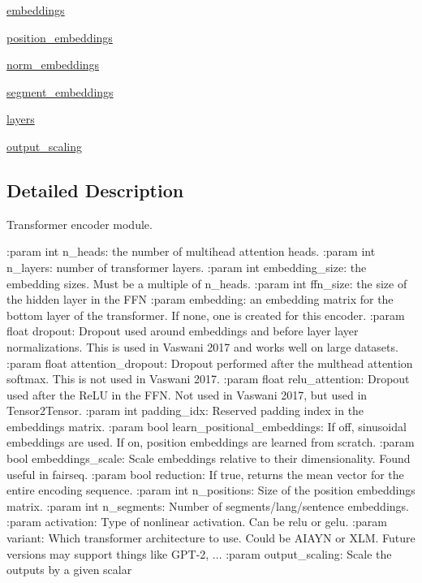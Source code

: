 \begin{DoxyCompactItemize}
\hyperlink{classparlai_1_1agents_1_1transformer_1_1modules_1_1TransformerEncoder_a179492c3f7ebaf6ba8fb3a7f912e93ce}{embeddings}
\item 
\hyperlink{classparlai_1_1agents_1_1transformer_1_1modules_1_1TransformerEncoder_ad2dd819e6d66d17f69e8bfa5026d192a}{position\+\_\+embeddings}
\item 
\hyperlink{classparlai_1_1agents_1_1transformer_1_1modules_1_1TransformerEncoder_ae8676d5d506949c00d35c34ac41b9fff}{norm\+\_\+embeddings}
\item 
\hyperlink{classparlai_1_1agents_1_1transformer_1_1modules_1_1TransformerEncoder_acbc50af3764335ae22ef2ba06a65c4a7}{segment\+\_\+embeddings}
\item 
\hyperlink{classparlai_1_1agents_1_1transformer_1_1modules_1_1TransformerEncoder_acbeff4ac94daff4e1627b6d93cd37424}{layers}
\item 
\hyperlink{classparlai_1_1agents_1_1transformer_1_1modules_1_1TransformerEncoder_ad904c0d06a4f6851b38fbbc0cab224f9}{output\+\_\+scaling}
\end{DoxyCompactItemize}


\subsection{Detailed Description}
\begin{DoxyVerb}Transformer encoder module.

:param int n_heads: the number of multihead attention heads.
:param int n_layers: number of transformer layers.
:param int embedding_size: the embedding sizes. Must be a multiple of n_heads.
:param int ffn_size: the size of the hidden layer in the FFN
:param embedding: an embedding matrix for the bottom layer of the transformer.
    If none, one is created for this encoder.
:param float dropout: Dropout used around embeddings and before layer
    layer normalizations. This is used in Vaswani 2017 and works well on
    large datasets.
:param float attention_dropout: Dropout performed after the multhead attention
    softmax. This is not used in Vaswani 2017.
:param float relu_attention: Dropout used after the ReLU in the FFN. Not used
    in Vaswani 2017, but used in Tensor2Tensor.
:param int padding_idx: Reserved padding index in the embeddings matrix.
:param bool learn_positional_embeddings: If off, sinusoidal embeddings are
    used. If on, position embeddings are learned from scratch.
:param bool embeddings_scale: Scale embeddings relative to their dimensionality.
    Found useful in fairseq.
:param bool reduction: If true, returns the mean vector for the entire encoding
    sequence.
:param int n_positions:
    Size of the position embeddings matrix.
:param int n_segments:
    Number of segments/lang/sentence embeddings.
:param activation:
    Type of nonlinear activation. Can be relu or gelu.
:param variant:
    Which transformer architecture to use. Could be AIAYN or XLM.
    Future versions may support things like GPT-2, ...
:param output_scaling:
    Scale the outputs by a given scalar
\end{DoxyVerb}
 

